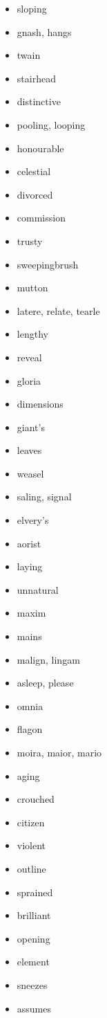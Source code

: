 \documentclass{article}
\begin{document}
\begin{itemize}
    \item sloping
    \item gnash, hangs
    \item twain
    \item stairhead
    \item distinctive
    \item pooling, looping
    \item honourable
    \item celestial
    \item divorced
    \item commission
    \item trusty
    \item sweepingbrush
    \item mutton
    \item latere, relate, tearle
    \item lengthy
    \item reveal
    \item gloria
    \item dimensions
    \item giant's
    \item leaves
    \item weasel
    \item saling, signal
    \item elvery's
    \item aorist
    \item laying
    \item unnatural
    \item maxim
    \item mains
    \item malign, lingam
    \item asleep, please
    \item omnia
    \item flagon
    \item moira, maior, mario
    \item aging
    \item crouched
    \item citizen
    \item violent
    \item outline
    \item sprained
    \item brilliant
    \item opening
    \item element
    \item sneezes
    \item assumes

\end{itemize}
\end{document}
